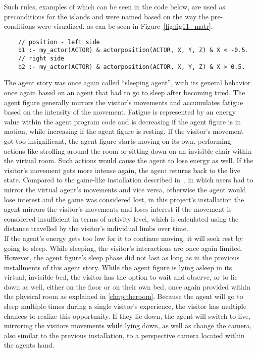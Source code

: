 \documentclass[draft,final]{vutinfth} %
\begin{document}
Such rules, examples of which can be seen in the code below, are used as preconditions for the islands and were named based on the way the pre-conditions were visualized, as can be seen in Figure~\ref{fig:fig11_matr}.
\begin{verbatim}
    // position - left side
    b1 :- my_actor(ACTOR) & actorposition(ACTOR, X, Y, Z) & X < -0.5.
    // right side
    b2 :- my_actor(ACTOR) & actorposition(ACTOR, X, Y, Z) & X > 0.5.
\end{verbatim}
The agent story was once again called “sleeping agent”, with its general behavior once again based on an agent that had to go to sleep after becoming tired. 
The agent figure generally mirrors the visitor’s movements and accumulates fatigue based on the intensity of the movement. 
Fatigue is represented by an energy value within the agent program code and is decreasing if the agent figure is in motion, while increasing if the agent figure is resting. 
If the visitor’s movement got too insignificant, the agent figure starts moving on its own, performing actions like strolling around the room or sitting down on an invisible chair within the virtual room. 
Such actions would cause the agent to lose energy as well. 
If the visitor’s movement gets more intense again, the agent returns back to the live state.
Compared to the game-like installation described in~\cite{bevacqua2015gestural}, in which users had to mirror the virtual agent’s movements and vice versa, otherwise the agent would lose interest and the game was considered lost, in this project’s installation the agent mirrors the visitor’s movements and loses interest if the movement is considered insufficient in terms of activity level, which is calculated using the distance travelled by the visitor’s individual limbs over time. \\
If the agent’s energy gets too low for it to continue moving, it will seek rest by going to sleep. 
While sleeping, the visitor’s interactions are once again limited. 
However, the agent figure’s sleep phase did not last as long as in the previous installments of this agent story. 
While the agent figure is lying asleep in its virtual, invisible bed, the visitor has the option to wait and observe, or to lie down as well, either on the floor or on their own bed, once again provided within the physical room as explained in \autoref{chap:theroom}. 
Because the agent will go to sleep multiple times during a single visitor’s experience, the visitor has multiple chances to realize this opportunity. 
If they lie down, the agent will switch to live, mirroring the visitors movements while lying down, as well as change the camera, also similar to the previous installation, to a perspective camera located within the agents hand. 
\end{document}
